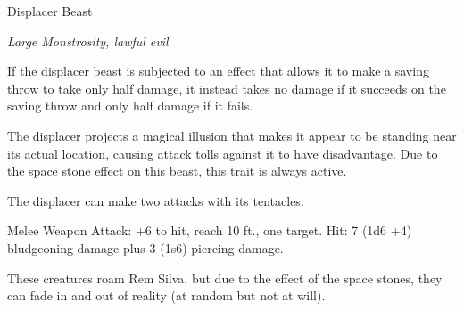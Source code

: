\begin{monsterbox}{Displacer Beast}
	\begin{hangingpar}
		\textit{Large Monstrosity, lawful evil}
	\end{hangingpar}
	\dndline%
	\basics[%
	armorclass = 13,
	hitpoints  = 85,
	speed      = 40 ft
	]
	\dndline%
	\stats[
	STR = \stat{18}, %
	DEX = \stat{15},
	CON = \stat{16},
	INT = \stat{6},
	WIS = \stat{12},
	CHA = \stat{8}
	]
	\dndline%
	\details[%
	senses = {darkvision 60 ft., passive perception 11},
	challenge = 3 (700XP)
	]
	\dndline%
	\begin{monsteraction}[Avoidance]
		If the displacer beast is subjected to an effect that allows it to make a saving throw to take only half damage, it instead takes no damage if it succeeds on the saving throw and only half damage if it fails.
	\end{monsteraction}	
	\begin{monsteraction}[Displacement]
		The displacer projects a magical illusion that makes it appear to be standing near its actual location, causing attack tolls against it to have disadvantage. Due to the space stone effect on this beast, this trait is always active.
	\end{monsteraction}	
	\begin{monsteraction}[Multiattack]
		The displacer can make two attacks with its tentacles. 
	\end{monsteraction}
	\begin{monsteraction}[Tentacle]
		Melee Weapon Attack: +6 to hit, reach 10 ft., one target. Hit: 7 (1d6 +4) bludgeoning damage plus 3 (1s6) piercing damage.
	\end{monsteraction}	
	These creatures roam Rem Silva, but due to the effect of the space stones, they can fade in and out of reality (at random but not at will).
\end{monsterbox}

